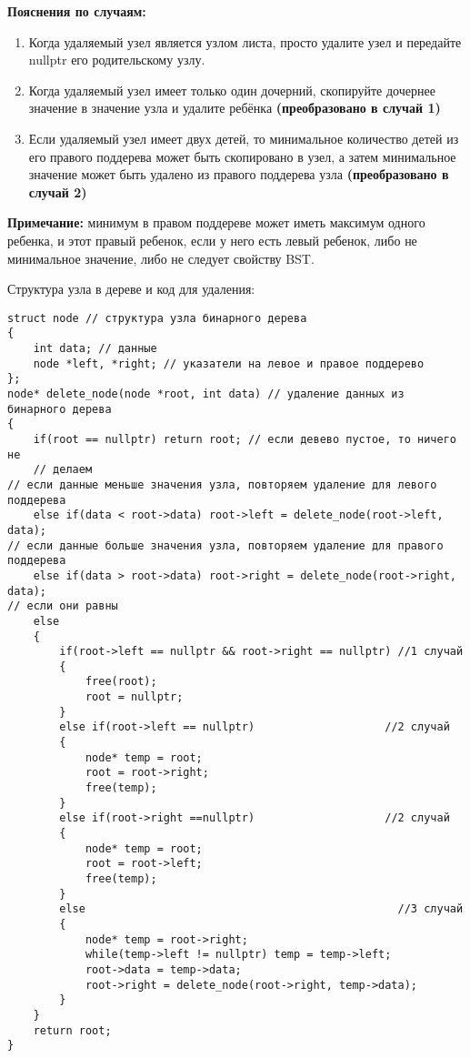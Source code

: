 \vspace{\baselineskip}
{\bfseries Пояснения по случаям:}

\begin{enumerate} 
	\item Когда удаляемый узел является узлом листа, просто удалите узел и передайте nullptr его родительскому узлу.
	\item Когда удаляемый узел имеет только один дочерний, скопируйте дочернее значение в значение узла и удалите ребёнка {\bfseries (преобразовано в случай 1)}
	\item Если удаляемый узел имеет двух детей, то минимальное количество детей из его правого поддерева может быть скопировано в узел, а затем минимальное значение может быть удалено из правого поддерева узла {\bfseries (преобразовано в случай 2)}
\end{enumerate}

\vspace{\baselineskip}
{\bfseries Примечание:} минимум в правом поддереве может иметь максимум одного ребенка, и этот правый ребенок, если у него есть левый ребенок, либо не минимальное значение, либо не следует свойству BST.

\vspace{\baselineskip}
Структура узла в дереве и код для удаления:

\vspace{\baselineskip}
\begin{tcolorbox}
\begin{verbatim}
struct node // структура узла бинарного дерева
{
	int data; // данные
	node *left, *right; // указатели на левое и правое поддерево
};
node* delete_node(node *root, int data) // удаление данных из бинарного дерева
{
	if(root == nullptr) return root; // если девево пустое, то ничего не 
	// делаем
// если данные меньше значения узла, повторяем удаление для левого поддерева
	else if(data < root->data) root->left = delete_node(root->left, data); 
// если данные больше значения узла, повторяем удаление для правого поддерева
	else if(data > root->data) root->right = delete_node(root->right, data);
// если они равны
	else
	{
		if(root->left == nullptr && root->right == nullptr) //1 случай
		{
			free(root);
			root = nullptr;
		}
		else if(root->left == nullptr)					  //2 случай
		{
			node* temp = root;
			root = root->right;
			free(temp);
		}
		else if(root->right ==nullptr)					  //2 случай
		{
			node* temp = root;
			root = root->left;
			free(temp);
		}
		else												//3 случай
		{
			node* temp = root->right;
			while(temp->left != nullptr) temp = temp->left;
			root->data = temp->data;
			root->right = delete_node(root->right, temp->data);
		}
	}
	return root;
}

\end{verbatim}
\end{tcolorbox}

